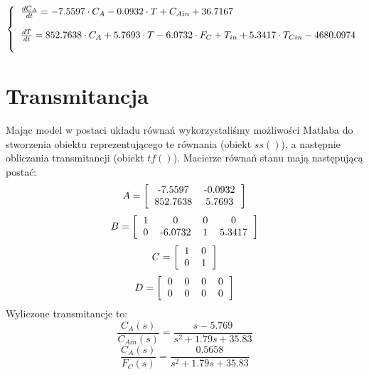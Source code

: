 \begin{equation}
\left\{
\begin{tabular}{l}
$\frac{dC_A}{dt} = -7.5597\cdot C_A-0.0932\cdot T+C_{Ain} + 36.7167$\\\\
$\frac{dT}{dt} = 852.7638\cdot C_A + 5.7693\cdot T -6.0732\cdot F_C + T_{in} + 5.3417\cdot T_{Cin} - 4680.0974$\\\\
\end{tabular}
\right.
\end{equation}
\newpage
\section{Transmitancja}
Mając model w postaci układu równań wykorzystaliśmy możliwości Matlaba do stworzenia obiektu reprezentującego te równania (obiekt $ss()$), a następnie obliczania transmitancji (obiekt $tf()$). Macierze równań stanu mają następującą postać:
\begin{equation}
	A=\left[
	\begin{tabular}{c c}
	-7.5597&-0.0932\\852.7638&5.7693
	\end{tabular}
	\right]
\end{equation}
\begin{equation}
B=\left[
\begin{tabular}{c c c c}
1&0&0&0\\0&-6.0732&1&5.3417
\end{tabular}
\right]
\end{equation}
\begin{equation}
C=\left[
\begin{tabular}{c c}
1&0\\0&1
\end{tabular}
\right]
\end{equation}
\begin{equation}
D=\left[
\begin{tabular}{c c c c}
0&0&0&0\\0&0&0&0
\end{tabular}
\right]
\end{equation}
Wyliczone transmitancje to:
\begin{equation}
	\frac{C_A(s)}{C_{Ain}(s)} = \frac{s-5.769}{s^2+1.79s+35.83}
\end{equation}
\begin{equation}
\frac{C_A(s)}{F_C(s)} = \frac{0.5658}{s^2+1.79s+35.83}
\end{equation}

